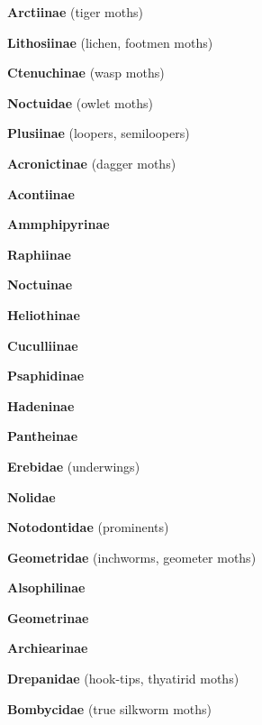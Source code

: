 \documentclass[letterpaper,10pt]{article}
\begin{document}
{\makebox[0.8cm]{}  \textbf{Arctiinae} (tiger moths) \par
\makebox[0.8cm]{}  \textbf{Lithosiinae} (lichen, footmen moths) \par
\makebox[0.8cm]{}  \textbf{Ctenuchinae} (wasp moths) \par
\makebox[0.6cm]{}  \textbf{Noctuidae} (owlet moths) \par
\makebox[0.8cm]{}  \textbf{Plusiinae} (loopers, semiloopers) \par
\makebox[0.8cm]{}  \textbf{Acronictinae} (dagger moths) \par
\makebox[0.8cm]{}  \textbf{Acontiinae} \par
\makebox[0.8cm]{}  \textbf{Ammphipyrinae} \par
\makebox[0.8cm]{}  \textbf{Raphiinae} \par
\makebox[0.8cm]{}  \textbf{Noctuinae} \par
\makebox[0.8cm]{}  \textbf{Heliothinae} \par
\makebox[0.8cm]{}  \textbf{Cuculliinae} \par
\makebox[0.8cm]{}  \textbf{Psaphidinae} \par
\makebox[0.8cm]{}  \textbf{Hadeninae} \par
\makebox[0.8cm]{}  \textbf{Pantheinae} \par
\makebox[0.6cm]{}  \textbf{Erebidae} (underwings) \par
\makebox[0.6cm]{}  \textbf{Nolidae} \par
\makebox[0.6cm]{}  \textbf{Notodontidae} (prominents) \par
\makebox[0.6cm]{}  \textbf{Geometridae} (inchworms, geometer moths) \par
\makebox[0.8cm]{}  \textbf{Alsophilinae} \par
\makebox[0.8cm]{}  \textbf{Geometrinae} \par
\makebox[0.8cm]{}  \textbf{Archiearinae} \par
\makebox[0.6cm]{}  \textbf{Drepanidae} (hook-tips, thyatirid moths) \par
\makebox[0.6cm]{}  \textbf{Bombycidae} (true silkworm moths) \par
}
\end{document}
